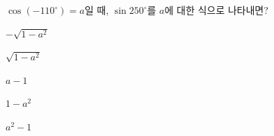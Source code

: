 $\cos(-110^\circ)=a$일 때, $\sin 250^\circ$를 $a$에 대한 식으로 나타내면?
\begin{choices32}{\rule[-3ex]{0pt}{8ex}$-\sqrt{1-a^2}$}{\rule[-3ex]{0pt}{8ex}$\sqrt{1-a^2}$}{\rule[-3ex]{0pt}{8ex}$a-1$}{\rule[-3ex]{0pt}{8ex}$1-a^2$}{\rule[-3ex]{0pt}{8ex}$a^2-1$}\end{choices32}
